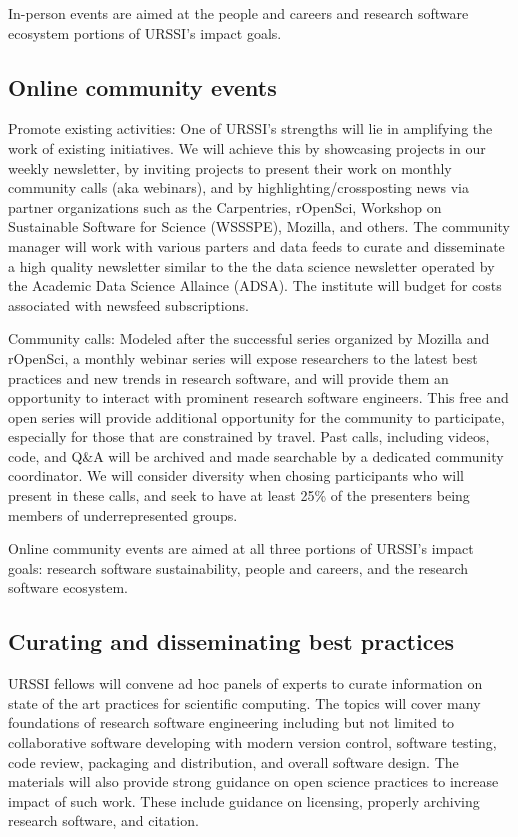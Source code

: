 \documentclass[
]{book}
\begin{document}
In-person events are aimed at the people and careers and research software ecosystem portions of URSSI's impact goals.

\hypertarget{online-community-events}{%
\subsection{Online community events}\label{online-community-events}}

Promote existing activities: One of URSSI's strengths will lie in amplifying the work of existing initiatives.
We will achieve this by showcasing projects in our weekly newsletter, by inviting projects to present their work on monthly community calls (aka webinars), and by highlighting/crossposting news via partner organizations such as the Carpentries, rOpenSci, Workshop on Sustainable Software for Science (WSSSPE), Mozilla, and others. The community manager will work with various parters and data feeds to curate and disseminate a high quality newsletter similar to the the data science newsletter operated by the Academic Data Science Allaince (ADSA). The institute will budget for costs associated with newsfeed subscriptions.

Community calls: Modeled after the successful series organized by Mozilla and rOpenSci, a monthly webinar series will expose researchers to the latest best practices and new trends in research software, and will provide them an opportunity to interact with prominent research software engineers.
This free and open series will provide additional opportunity for the community to participate, especially for those that are constrained by travel.
Past calls, including videos, code, and Q\&A will be archived and made searchable by a dedicated community coordinator.
We will consider diversity when chosing participants who will present in these calls, and seek to have at least 25\% of the presenters being members of underrepresented groups.

Online community events are aimed at all three portions of URSSI's impact goals: research software sustainability, people and careers, and the research software ecosystem.

\hypertarget{Ch-Comm-Best-Practices}{%
\subsection{Curating and disseminating best practices}\label{Ch-Comm-Best-Practices}}

URSSI fellows will convene ad hoc panels of experts to curate information on state of the art practices for scientific computing.
The topics will cover many foundations of research software engineering including but not limited to collaborative software developing with modern version control, software testing, code review, packaging and distribution, and overall software design.
The materials will also provide strong guidance on open science practices to increase impact of such work.
These include guidance on licensing, properly archiving research software, and citation.
\end{document}
